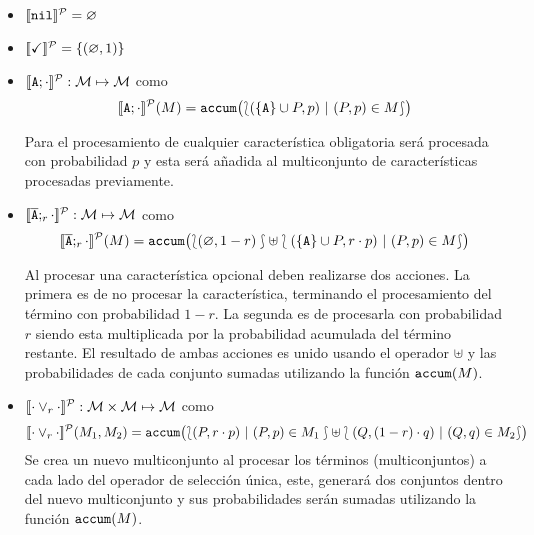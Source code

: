 




\bdfn\label{def:semantic:operators}

  \begin{itemize}
        
  \item $[\![\mathtt{nil}]\!]^{\cal P}=\varnothing$
  
  \item $[\![\checkmark]\!]^{\cal P}=\{(\varnothing,1)\}$
   
  \item 
    $[\![\mathtt{A};\cdot]\!]^{\cal P}:{\cal M}\mapsto{\cal M}$
    como
    $$[\![\mathtt{A};\cdot]\!]^{\cal P}(M)= 
      \mathtt{accum}\bigl(\lbag(\{\mathtt{A}\}\cup P,p)\ |\ (P,p)\in M\rbag\bigr)
         $$
  
  Para el procesamiento de cualquier característica obligatoria
  será procesada con probabilidad $p$ y esta será añadida
  al multiconjunto de características procesadas previamente.
  

  \item 
    $[\![\overline{\mathtt{A}};_{r}\cdot]\!]^{\cal P}:{\cal M}\mapsto{\cal M}$
    como
    $$[\![\overline{\mathtt{A}};_{r}\cdot]\!]^{\cal P}(M)=
                \mathtt{accum}\bigl(\lbag(\varnothing , 1-r )\rbag\uplus\lbag (\{\mathtt{A}\}\cup P, r\cdot p ) \ |\ (P,p) \in M\rbag\bigr)$$

  Al procesar una característica opcional deben realizarse
  dos acciones. La primera es de no procesar la característica,
  terminando el procesamiento del término con probabilidad $1-r$.
  La segunda es de procesarla con probabilidad $r$ siendo esta
  multiplicada por la probabilidad acumulada
  del término restante. El resultado de ambas acciones es
  unido usando el operador $\uplus$ y las probabilidades 
  de cada conjunto sumadas utilizando la función $\mathtt{accum}(M)$.
  
  \item 
    $[\![\cdot\mathbin{\lor}_{r}\cdot]\!]^{\cal P}:{\cal M}\times{\cal M}\mapsto{\cal M}$
    como 
    $$[\![\cdot\mathbin{\lor}_{r}\cdot]\!]^{\cal P}(M_{1},M_{2})=\mathtt{accum}\bigl(\lbag(P,r\cdot p  ) \ |\ (P,p) \in
    M_{1}\rbag \uplus \lbag(Q, (1-r)\cdot q  ) \ |\ (Q,q) \in M_{2}\rbag\bigr) $$
  Se crea un nuevo multiconjunto al procesar los términos (multiconjuntos) a cada
  lado del operador de selección única, este, generará dos conjuntos dentro del
  nuevo multiconjunto y sus probabilidades serán sumadas utilizando la función $\mathtt{accum}(M)$.


\end{itemize}
